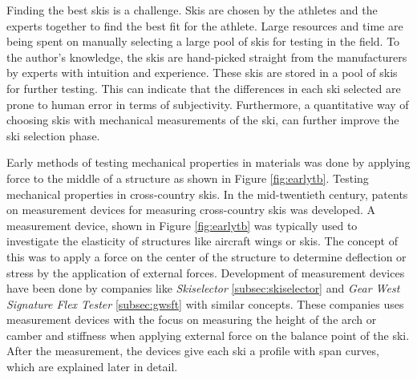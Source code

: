 Finding the best skis is a challenge. Skis are chosen by the athletes and the experts together to find the best fit for the athlete. Large resources and time are being spent on manually selecting a large pool of skis for testing in the field. To the author's knowledge, the skis are hand-picked straight from the manufacturers by experts with intuition and experience. These skis are stored in a pool of skis for further testing. This can indicate that the differences in each ski selected are prone to human error in terms of subjectivity. Furthermore, a quantitative way of choosing skis with mechanical measurements of the ski, can further improve the ski selection phase.

Early methods of testing mechanical properties in materials was done by applying force to the middle of a structure as shown in Figure \ref{fig:earlytb}. Testing mechanical properties in cross-country skis. In the mid-twentieth century, patents on measurement devices for measuring cross-country skis was developed. A measurement device, shown in Figure \ref{fig:earlytb} was typically used to investigate the elasticity of structures like aircraft wings or skis. The concept of this was to apply a force on the center of the structure to determine deflection or stress by the application of external forces.
Development of measurement devices have been done by companies like \textit{Skiselector} \ref{subsec:skiselector} and \textit{Gear West Signature Flex Tester} \ref{subsec:gwsft} with similar concepts. These companies uses measurement devices with the focus on measuring the height of the arch or camber and stiffness when applying external force on the balance point of the ski. After the measurement, the devices give each ski a profile with span curves, which are explained later in detail.

